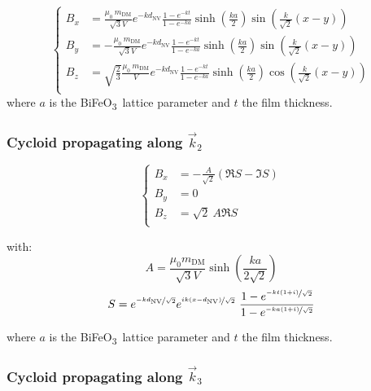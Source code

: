\documentclass[a4paper,12pt]{article}
\newcommand{\BFO}{BiFeO\textsubscript{3}\ }
\begin{document}
 \begin{equation*}
    \left \lbrace
      \begin{aligned}
        B_{x} & = \frac{\mu_0 \ m_\text{DM}}{\sqrt{3} V}  e^{-k d_\text{NV}} \frac{1-e^{-kt}}{1-e^{-ka}} \sinh \left(\frac{ka}{2}\right) \sin\left( \frac{k}{\sqrt{2}} (x-y)\right) \\
        B_{y} & = -\frac{\mu_0 \ m_\text{DM}}{\sqrt{3} V}  e^{-k d_\text{NV}} \frac{1-e^{-kt}}{1-e^{-ka}} \sinh \left(\frac{ka}{2}\right) \sin\left( \frac{k}{\sqrt{2}} (x-y)\right) \\
        B_{z} & = \sqrt{\frac{2}{3}} \frac{\mu_0 \ m_\text{DM}}{V}  e^{-k d_\text{NV}} \frac{1-e^{-kt}}{1-e^{-ka}} \sinh \left(\frac{ka}{2}\right) \cos\left( \frac{k}{\sqrt{2}} (x-y)\right) \\
      \end{aligned}
    \right.
  \end{equation*}
  where $a$ is the \BFO lattice parameter and $t$ the film thickness.

  \clearpage
  \subsubsection{Cycloid propagating along $\vec{k}_2$}

\begin{equation*}
    \left \lbrace
      \begin{aligned}
        B_x & = - \frac{A}{\sqrt{2}} \left(  \Re{S}-
          \Im{S} \right)\\
        B_y &= 0\\
        B_z & =  \sqrt{2} \ A \Re{S}\\
      \end{aligned}
    \right.
  \end{equation*}

  \vspace*{10mm}

  with:
  \[A = \frac{\mu_0 m_\text{DM}}{\sqrt{3}V}\sinh(\frac{ka}{2\sqrt{2}})\] 
  \[S = e^{\nicefrac{-kd_\text{NV}}{\sqrt{2}}} e^{\nicefrac{ik(x-d_\text{NV})}{\sqrt{2}}}   \        \frac{1-e^{\nicefrac{-kt(1+i)}{\sqrt{2}}}}{1-e^{\nicefrac{-ka(1+i)}{\sqrt{2}}}} \]

   where $a$ is the \BFO lattice parameter and $t$ the film thickness.

   \subsubsection{Cycloid propagating along $\vec{k}_3$}
\end{document}
